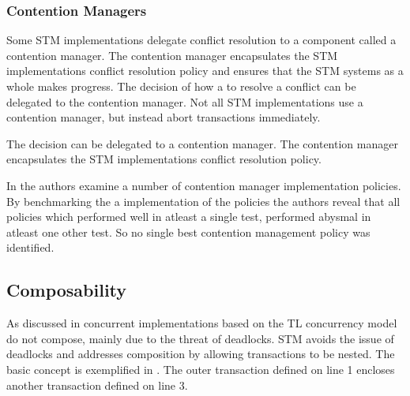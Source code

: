 \subsubsection{Contention Managers}
\label{subsub:con_managers}
Some \ac{STM} implementations delegate conflict resolution to a component called a contention manager\cite[p. 2085]{herlihy2011tm}. The contention manager encapsulates the \ac{STM} implementations conflict resolution policy\cite[p. 2085]{herlihy2011tm} and ensures that the \ac{STM} systems as a whole makes progress\cite[p. 1]{guerraoui2005toward}. The decision of how a to resolve a conflict can be delegated to the contention manager. Not all \ac{STM} implementations use a contention manager, but instead abort transactions immediately\cite[38]{riegel2013software}.

The decision can be delegated to a contention manager. The contention manager encapsulates the \ac{STM} implementations conflict resolution policy\cite[p. 2085]{herlihy2011tm}.

In \cite{scherer2004contention} the authors examine a number of contention manager implementation policies. By benchmarking the a implementation of the policies the authors reveal that all policies which performed well in atleast a single test, performed abysmal in atleast one other test. So no single best contention management policy was identified.

\subsection{Composability}
\label{sec:stm_composability}
As discussed in  concurrent implementations based on the \ac{TL} concurrency model do not compose, mainly due to the threat of deadlocks. \ac{STM} avoids the issue of deadlocks and addresses composition by allowing transactions to be nested. The basic concept is exemplified in . The outer transaction defined on line 1 encloses another transaction defined on line 3.


